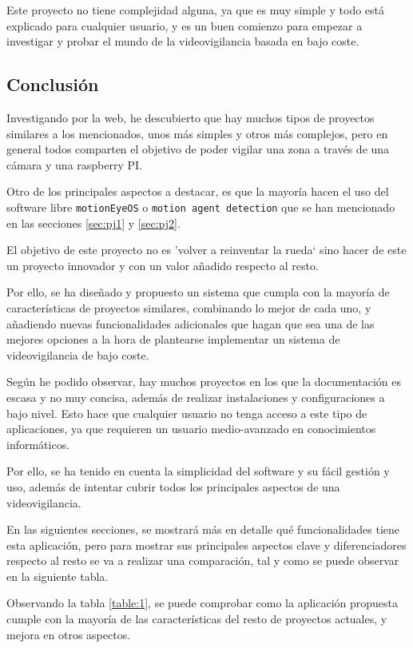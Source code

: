 Este proyecto no tiene complejidad alguna, ya que es muy simple y todo está explicado para cualquier usuario, y es un buen comienzo para empezar a investigar y probar el mundo de la videovigilancia basada en bajo coste.

\subsection{Conclusión}

Investigando por la web, he descubierto que hay muchos tipos de proyectos similares a los mencionados, unos más simples y otros más complejos, pero en general todos comparten el objetivo de poder vigilar una zona a través de una cámara y una raspberry PI.

\newpage

Otro de los principales aspectos a destacar, es que la mayoría hacen el uso del software libre \texttt{motionEyeOS} o \texttt{motion agent detection} que se han mencionado en las secciones \ref{sec:pj1} y \ref{sec:pj2}.

El objetivo de este proyecto no es 'volver a reinventar la rueda` sino hacer de este un proyecto innovador y con un valor añadido respecto al resto.

Por ello, se ha diseñado y propuesto un sistema que cumpla con la mayoría de características de proyectos similares, combinando lo mejor de cada uno, y añadiendo nuevas funcionalidades adicionales que hagan que sea una de las mejores opciones a la hora de plantearse implementar un sistema de videovigilancia de bajo coste.

Según he podido observar, hay muchos proyectos en los que la documentación es escasa y no muy concisa, además de realizar instalaciones y configuraciones a bajo nivel. Esto hace que cualquier usuario no tenga acceso a este tipo de aplicaciones, ya que requieren un usuario medio-avanzado en conocimientos informáticos.

Por ello, se ha tenido en cuenta la simplicidad del software y su fácil gestión y uso, además de intentar cubrir todos los principales aspectos de una videovigilancia.

En las siguientes secciones, se mostrará más en detalle qué funcionalidades tiene esta aplicación, pero para mostrar sus principales aspectos clave y diferenciadores respecto al resto se va a realizar una comparación, tal y como se puede observar en la siguiente tabla.


Observando la tabla \ref{table:1}, se puede comprobar como la aplicación propuesta cumple con la mayoría de las características del resto de proyectos actuales, y mejora en otros aspectos.

